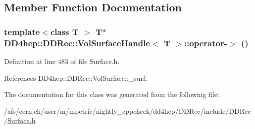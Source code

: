 \subsection{Member Function Documentation}
\hypertarget{class_d_d4hep_1_1_d_d_rec_1_1_vol_surface_handle_a4151ddc65e68b405fb406ebb6b6622a1}{
\subsubsection[{operator-\/$>$}]{\setlength{\rightskip}{0pt plus 5cm}template$<$class T $>$ {\bf T}$\ast$ {\bf DD4hep::DDRec::VolSurfaceHandle}$<$ {\bf T} $>$::operator-\/$>$ ()}}
\label{class_d_d4hep_1_1_d_d_rec_1_1_vol_surface_handle_a4151ddc65e68b405fb406ebb6b6622a1}


Definition at line 483 of file Surface.h.

References DD4hep::DDRec::VolSurface::\_\-surf.

The documentation for this class was generated from the following file:\begin{DoxyCompactItemize}
\item 
/afs/cern.ch/user/m/mpetric/nightly\_\-cppcheck/dd4hep/DDRec/include/DDRec/\hyperlink{_surface_8h}{Surface.h}\end{DoxyCompactItemize}
